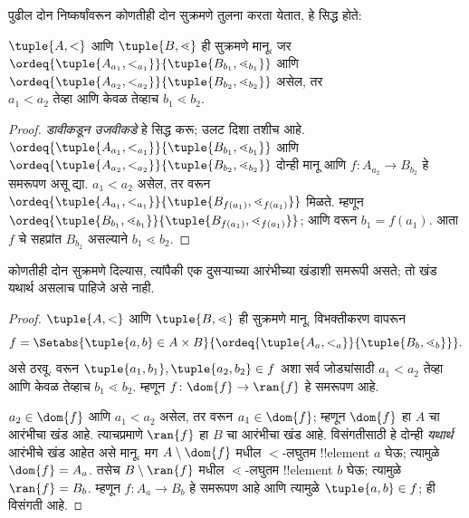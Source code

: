 \documentclass[../../../include/open-logic-section]{subfiles}
\begin{document}
पुढील दोन निष्कर्षांवरून कोणतीही दोन सुक्रमणे तुलना करता येतात, हे सिद्ध होते:

\begin{lem}
$\tuple{A, <}$ आणि $\tuple{B, \lessdot}$ ही सुक्रमणे मानू. जर
$\ordeq{\tuple{A_{a_1}, <_{a_1}}}{\tuple{B_{b_1}, \lessdot_{b_1}}}$
आणि $\ordeq{\tuple{A_{{a_2}}, <_{a_2}}}{\tuple{B_{{b_2}},
\lessdot_{b_2}}}$ असेल, तर ${a_1}  < {a_2} \text{ तेव्हा आणि केवळ तेव्हाच }{b_1} \lessdot
{b_2}$.
\end{lem}

\begin{proof}
\emph{डावीकडून उजवीकडे} हे सिद्ध करू; उलट दिशा तशीच आहे.
$\ordeq{\tuple{A_{a_1}, <_{a_1}}}{\tuple{B_{b_1},
\lessdot_{b_1}}}$ आणि $\ordeq{\tuple{A_{{a_2}},
<_{a_2}}}{\tuple{B_{{b_2}}, \lessdot_{b_2}}}$ दोन्ही मानू आणि $f \colon
A_{{a_2}} \to B_{{b_2}}$ हे समरूपण असू द्या. ${a_1} < {a_2}$ असेल, तर
 वरून
$\ordeq{\tuple{A_{a_1}, <_{a_1}}}{\tuple{B_{f({a_1})},
\lessdot_{f({a_1})}}}$ मिळते. म्हणून
$\ordeq{\tuple{B_{b_1}, \lessdot_{b_1}}}{\tuple{B_{f({a_1})},
\lessdot_{f({a_1})}}}$; आणि  वरून ${b_1} = f({a_1})$. आता $f$ चे सहप्रांत $B_{{b_2}}$ असल्याने ${b_1} \lessdot {b_2}$.
\end{proof}

\begin{thm}
कोणतीही दोन सुक्रमणे दिल्यास, त्यांपैकी एक दुसऱ्याच्या आरंभीच्या खंडाशी समरूपी असते; तो खंड यथार्थ असलाच पाहिजे असे नाही.
\end{thm}

\begin{proof}
$\tuple{A, <}$ आणि $\tuple{B, \lessdot}$ ही सुक्रमणे मानू. विभक्तीकरण वापरून
\[
	f = \Setabs{\tuple{a, b} \in A \times B}{
		\ordeq{\tuple{A_a, <_a}}{\tuple{B_b, \lessdot_b}}}.
\]
असे ठरवू.  वरून $\tuple{a_1, b_1}, \tuple{a_2, b_2} \in f$ अशा सर्व जोड्यांसाठी $a_1 < a_2$ तेव्हा आणि केवळ तेव्हाच $b_1 \lessdot b_2$. म्हणून $f \colon \dom{f} \to
\ran{f}$ हे समरूपण आहे.

$a_2 \in \dom{f}$ आणि $a_1 < a_2$ असेल, तर  वरून $a_1 \in \dom{f}$; म्हणून $\dom{f}$ हा $A$ चा आरंभीचा खंड आहे. त्याचप्रमाणे $\ran{f}$ हा $B$ चा आरंभीचा खंड आहे. विसंगतीसाठी हे दोन्ही \emph{यथार्थ} आरंभीचे खंड आहेत असे मानू. मग $A \setminus \dom{f}$ मधील $<$-लघुतम !!{element} $a$ घेऊ; त्यामुळे $\dom{f} = A_a$. तसेच $B \setminus
\ran{f}$ मधील $\lessdot$-लघुतम !!{element} $b$ घेऊ; त्यामुळे $\ran{f} = B_b$. म्हणून $f \colon A_a \to B_b$ हे समरूपण आहे आणि त्यामुळे $\tuple{a, b} \in f$; ही विसंगती आहे.
\end{proof}
\end{document}
